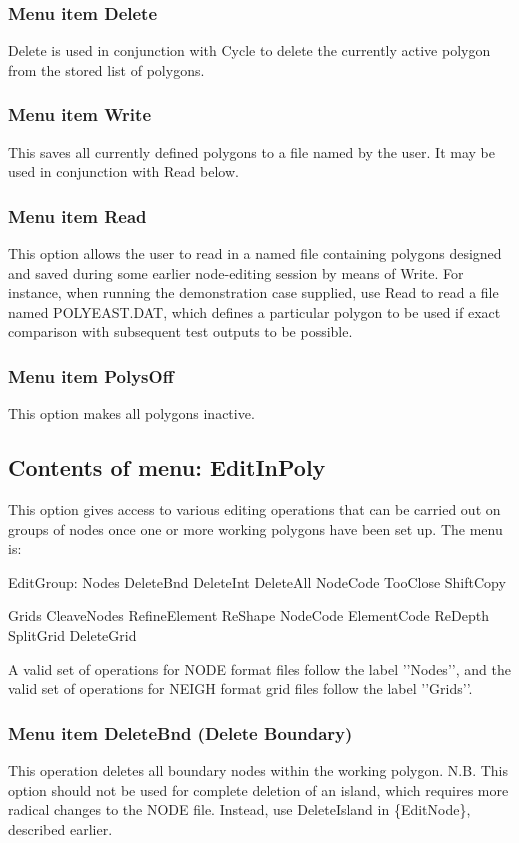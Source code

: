 \documentclass{article}
\begin{document}
\subsubsection[Menu item Delete]{Menu item Delete}
Delete is used in conjunction with Cycle to delete the currently active polygon from the stored list of polygons.

\subsubsection[Menu item Write]{Menu item Write}
This saves all currently defined polygons to a file named by the user. It may be used in conjunction with Read below.

\subsubsection[Menu item Read]{Menu item Read}
This option allows the user to read in a named file containing polygons designed and saved during some earlier node-editing session by means of Write. For instance, when running the demonstration case supplied, use Read to read a file named POLYEAST.DAT, which defines a particular polygon to be used if exact comparison with subsequent test outputs to be possible.

\subsubsection[Menu item PolysOff]{Menu item PolysOff}
This option makes all polygons inactive.

\subsection{Contents of menu: EditInPoly}
This option gives access to various editing operations that can be carried out on groups of nodes once one or more working polygons have been set up. The menu is:

EditGroup: Nodes {\textbar} DeleteBnd DeleteInt DeleteAll NodeCode TooClose ShiftCopy {\textbar} 

Grids {\textbar} CleaveNodes RefineElement ReShape NodeCode ElementCode ReDepth SplitGrid DeleteGrid

A valid set of operations for NODE format files follow the label '{}'Nodes'{}', and the valid set of operations for NEIGH format grid files follow the label '{}'Grids'{}'.

\subsubsection[Menu item DeleteBnd (Delete Boundary)]{Menu item DeleteBnd (Delete Boundary)}
This operation deletes all boundary nodes within the working polygon. N.B. This option should not be used for complete deletion of an island, which requires more radical changes to the NODE file. Instead, use DeleteIsland in \{EditNode\}, described earlier.
\end{document}
